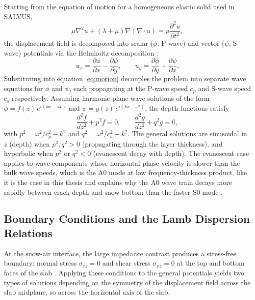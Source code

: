 Starting from the equation of motion for a homogeneous elastic solid used in SALVUS,
\begin{equation}
    \mu \nabla^2 u + (\lambda + \mu) \nabla (\nabla \cdot u) = 
    \rho \frac{\partial^2 u}{\partial t^2},
    \label{eq:motion}
\end{equation}
the displacement field is decomposed into scalar ($\phi$, P-wave) and vector 
($\psi$, S-wave) potentials via the Helmholtz decomposition 
\parencite{achenbachWavePropagationElastic2012}:
\begin{equation}
    u_x = \frac{\partial \phi}{\partial x} - \frac{\partial \psi}{\partial y}, 
    \qquad 
    u_y = \frac{\partial \phi}{\partial y} + \frac{\partial \psi}{\partial x}.
\end{equation}
Substituting into equation \ref{eq:motion} decouples the problem into 
separate wave equations for $\phi$ and $\psi$, each propagating at the 
P-wave speed $c_p$ and S-wave speed $c_s$ respectively. Assuming harmonic 
plane wave solutions of the form $\phi = f(z)\,e^{i(kx-\omega t)}$ and 
$\psi = g(z)\,e^{i(kx-\omega t)}$, the depth functions satisfy
\begin{equation}
    \frac{d^2f}{dz^2} + p^2 f = 0, \qquad 
    \frac{d^2g}{dz^2} + q^2 g = 0,
\end{equation}
with $p^2 = \omega^2/c_p^2 - k^2$ and $q^2 = \omega^2/c_s^2 - k^2$. The 
general solutions are sinusoidal in $z$  (depth) when $p^2, q^2 > 0$ (propagating through the layer thickness), and hyperbolic when $p^2$ or $q^2 < 0$ (evanescent decay with depth). The evanescent case applies to wave components whose horizontal phase velocity is slower than the bulk wave speeds, which is the A0 mode at low frequency-thickness product, like it is the case in this thesis and explains why the A0 wave train decays more rapidly between crack depth and snow bottom than the faster S0 mode \parencite{graffWaveMotionElastic1975}. \par

\subsection{Boundary Conditions and the Lamb Dispersion Relations}

At the snow-air interface, the large impedance contrast produces a stress-free boundary: normal stress $\sigma_{zz} = 0$ and shear stress $\sigma_{xz} = 0$ at the top and bottom faces of the slab \parencite{igelComputationalSeismologyPractical2016}. Applying these conditions to the general potentials yields two types of solutions depending on the symmetry of the displacement field across the slab midplane, so across the horizontal axis of the slab. \par

